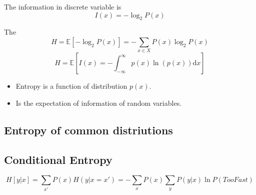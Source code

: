 \begin{definition}
    The information in discrete variable is
    \[ I(x) = -\log_2 P(x) \]
\end{definition}
\begin{definition}[Entropy]
    The 
    \[ H = \mathbb{E}[-\log_2 P(x)] = -\sum_{x\in X}P(x)\log_2 P(x) \]
    \[ H = \mathbb{E}[I(x) = -\int_{-\infty}^{\infty}p(x)\ln(p(x))\mathrm{d}x] \]
\end{definition}
\begin{remark}
    \begin{itemize}
        \item Entropy is a function of distribution $p(x)$.
        \item Is the expectation of information of random variables.
    \end{itemize}
\end{remark}

\subsection{Entropy of common distriutions}

\subsection{Conditional Entropy}
\begin{definition}
    \[ H[y|x] = \sum_{x'}P(x)H(y|x=x') = -\sum_{x}P(x)\sum_yP(y|x)\ln P(TooFast) \]
\end{definition}